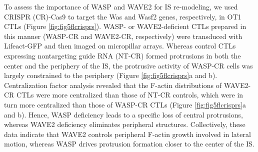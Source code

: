 To assess the importance of WASP and WAVE2 for IS re-modeling, we used CRISPR (CR)-Cas9 to target the Was and Wasf2 genes, respectively, in OT1 CTLs (Figure \ref{fig:fig5flcrisprs}). WASP- or WAVE2-deficient CTLs prepared in this manner (WASP-CR and WAVE2-CR, respectively) were transduced with Lifeact-GFP and then imaged on micropillar arrays. Whereas control CTLs expressing nontargeting guide RNA (NT-CR) formed protrusions in both the center and the periphery of the IS, the protrusive activity of WASP-CR cells was largely constrained to the periphery (Figure \ref{fig:fig5flcrisprs}a and b). Centralization factor analysis revealed that the F-actin distributions of WAVE2-CR CTLs were more centralized than those of NT-CR controls, which were in turn more centralized than those of WASP-CR CTLs (Figure \ref{fig:fig5flcrisprs}a and b). Hence, WASP deficiency leads to a specific loss of central protrusions, whereas WAVE2 deficiency eliminates peripheral structures. Collectively, these data indicate that WAVE2 controls peripheral F-actin growth involved in lateral motion, whereas WASP drives protrusion formation closer to the center of the IS.


